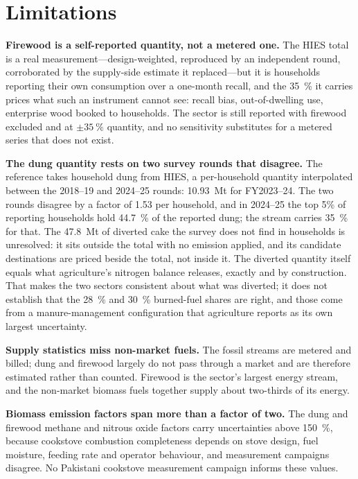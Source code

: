 \section{Limitations}
\label{sec:limitations}

\textbf{Firewood is a self-reported quantity, not a metered one.} The HIES total is a real
measurement---design-weighted, reproduced by an independent round, corroborated by the
supply-side estimate it replaced---but it is households reporting their own consumption over
a one-month recall, and the \SI{35}{\percent} it carries prices what such an instrument
cannot see: recall bias, out-of-dwelling use, enterprise wood booked to households. The
sector is still reported with firewood excluded and at $\pm\SI{35}{\percent}$ quantity, and
no sensitivity substitutes for a metered series that does not exist.

\textbf{The dung quantity rests on two survey rounds that disagree.} The reference takes
household dung from HIES, a per-household quantity interpolated between the 2018--19 and
2024--25 rounds: \SI{10.93}{\mega\tonne} for FY2023--24. The two rounds disagree by a
factor of \num{1.53} per household, and in 2024--25 the top 5\% of reporting households
hold \SI{44.7}{\percent} of the reported dung; the stream carries \SI{35}{\percent} for
that. The \SI{47.8}{\mega\tonne} of diverted cake the survey does not find in households
is unresolved: it sits outside the total with no emission applied, and its candidate
destinations are priced beside the total, not inside it. The diverted quantity itself
equals what agriculture's nitrogen
balance releases, exactly and by construction. That makes the two sectors consistent about
what was diverted; it does
not establish that the \SI{28}{\percent} and \SI{30}{\percent} burned-fuel shares are right,
and those come from a manure-management configuration that agriculture reports as its own
largest uncertainty.

\textbf{Supply statistics miss non-market fuels.} The fossil streams are metered and billed;
dung and firewood largely do not pass through a market and are therefore estimated rather than
counted. Firewood is the sector's largest energy stream, and the non-market biomass fuels
together supply about two-thirds of its energy.

\textbf{Biomass emission factors span more than a factor of two.} The dung and firewood methane
and nitrous oxide factors carry uncertainties above \SI{150}{\percent}, because cookstove
combustion completeness depends on stove design, fuel moisture, feeding rate and operator
behaviour, and measurement campaigns disagree. No Pakistani cookstove measurement campaign
informs these values.

